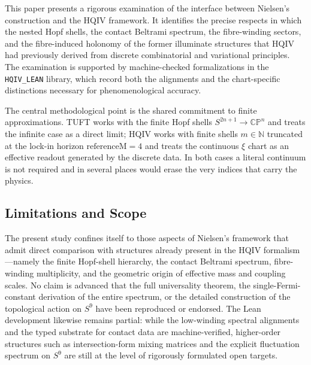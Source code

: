 \documentclass[11pt]{article}
\begin{document}
This paper presents a rigorous examination of the interface between
Nielsen's construction and the HQIV framework. It identifies the precise
respects in which the nested Hopf shells, the contact Beltrami spectrum,
the fibre-winding sectors, and the fibre-induced holonomy of the former
illuminate structures that HQIV had previously derived from discrete
combinatorial and variational principles. The examination is supported
by machine-checked formalizations in the \texttt{HQIV\_LEAN} library,
which record both the alignments and the chart-specific distinctions
necessary for phenomenological accuracy.

The central methodological point is the shared commitment to finite
approximations. TUFT works with the finite Hopf shells $S^{2n+1}\to
\mathbb{CP}^n$ and treats the infinite case as a direct limit; HQIV works
with finite shells $m\in\mathbb{N}$ truncated at the lock-in horizon
$\mathrm{referenceM}=4$ and treats the continuous $\xi$ chart as an
effective readout generated by the discrete data. In both cases a literal
continuum is not required and in several places would erase the very
indices that carry the physics.

\subsection{Limitations and Scope}

The present study confines itself to those aspects of Nielsen's
framework that admit direct comparison with structures already present
in the HQIV formalism—namely the finite Hopf-shell hierarchy, the
contact Beltrami spectrum, fibre-winding multiplicity, and the geometric
origin of effective mass and coupling scales. No claim is advanced that
the full universality theorem, the single-Fermi-constant derivation of
the entire spectrum, or the detailed construction of the topological
action on $S^9$ have been reproduced or endorsed. The Lean development
likewise remains partial: while the low-winding spectral alignments and
the typed substrate for contact data are machine-verified, higher-order
structures such as intersection-form mixing matrices and the explicit
fluctuation spectrum on $S^9$ are still at the level of rigorously
formulated open targets.
\end{document}
